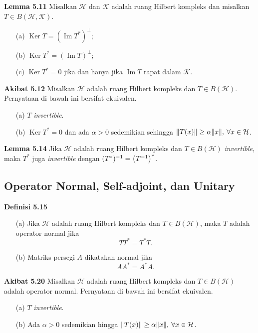 \documentclass{article}
\begin{document}
\begin{multicols}{2}
  \textbf{Lemma 5.11} Misalkan \(\mathcal{H}\) dan \(\mathcal{K}\) adalah ruang Hilbert kompleks dan misalkan \(T \in B(\mathcal{H}, \mathcal{K})\).
  \begin{itemize}
    \item[(a)] \(\operatorname{Ker }T = (\operatorname{Im }T^*)^\perp\);
    \item[(b)] \(\operatorname{Ker }T^* = (\operatorname{Im }T)^\perp\);
    \item[(c)] \(\operatorname{Ker }T^* = \qty{0}\) jika dan hanya jika \(\operatorname{Im }T\) rapat dalam \(\mathcal{K}\).
  \end{itemize}

  \textbf{Akibat 5.12} Misalkan \(\mathcal{H}\) adalah ruang Hilbert kompleks dan \(T \in B(\mathcal{H})\). Pernyataan di bawah ini bersifat ekuivalen.
  \begin{itemize}
    \item[(a)] \(T\) \textit{invertible}.
    \item[(b)] \(\operatorname{Ker }T^* = \qty{0}\) dan ada \(\alpha > 0\) sedemikian sehingga \(\norm{T(x)} \geq \alpha\norm{x},\: \forall x \in \mathcal{H}\).
  \end{itemize}

  \textbf{Lemma 5.14} Jika \(\mathcal{H}\) adalah ruang Hilbert kompleks dan \(T \in B(\mathcal{H})\) \textit{invertible}, maka \(T^*\) juga \textit{invertible} dengan \((T^*)^{-1} = \qty(T^{-1})^*\).

  \subsection*{Operator Normal, Self-adjoint, dan Unitary}
  \textbf{Definisi 5.15}
  \begin{itemize}
    \item[(a)] Jika \(\mathcal{H}\) adalah ruang Hilbert kompleks dan \(T \in B(\mathcal{H})\), maka \(T\) adalah operator normal jika
          \[TT^* = T^*T. \]
    \item[(b)] Matriks persegi \(A\) dikatakan normal jika
          \[AA^* = A^*A. \]
  \end{itemize}

  \textbf{Akibat 5.20} Misalkan \(\mathcal{H}\) adalah ruang Hilbert kompleks dan \(T\in B(\mathcal{H})\) adalah operator normal. Pernyataan di bawah ini bersifat ekuivalen.
  \begin{itemize}
    \item[(a)] \(T\) \textit{invertible}.
    \item[(b)] Ada \(\alpha > 0\) sedemikian hingga \(\norm{T(x)} \geq \alpha\norm{x},\: \forall x \in \mathcal{H}\).
  \end{itemize}


\end{multicols}
\end{document}
